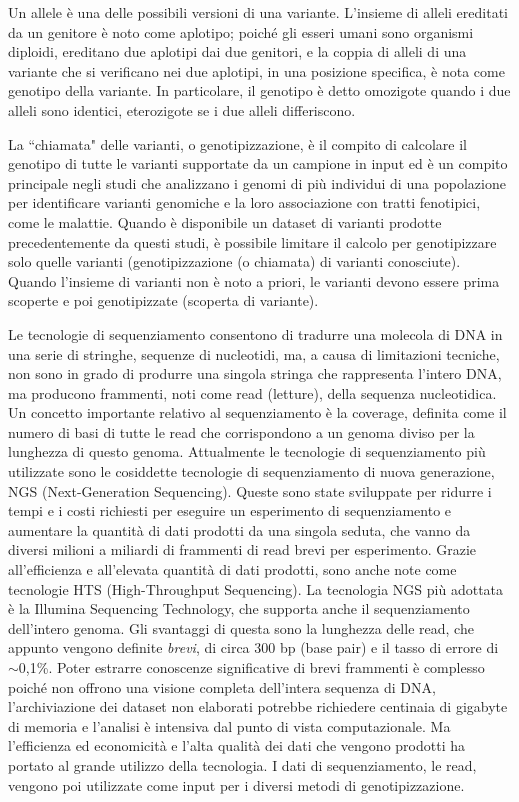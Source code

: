 \documentclass[../main.tex]{subfiles}
\begin{document}
Un allele è una delle possibili versioni di una variante. L'insieme di alleli ereditati da un genitore è noto come aplotipo; poiché gli esseri umani sono organismi diploidi, ereditano due aplotipi dai due genitori, e la coppia di alleli di una variante che si verificano nei due aplotipi, in una posizione specifica, è nota come genotipo della variante. In particolare, il genotipo è detto omozigote quando i due alleli sono identici, eterozigote se i due alleli differiscono. 

La ``chiamata" delle varianti, o genotipizzazione, è il compito di calcolare il genotipo di tutte le varianti supportate da un campione in input ed è un compito principale negli studi che analizzano i genomi di più individui di una popolazione per identificare varianti genomiche e la loro associazione con tratti fenotipici, come le malattie. Quando è disponibile un dataset di varianti prodotte precedentemente da questi studi, è possibile limitare il calcolo per genotipizzare solo quelle varianti (genotipizzazione (o chiamata) di varianti conosciute). Quando l'insieme di varianti non è noto a priori, le varianti devono essere prima scoperte e poi genotipizzate (scoperta di variante).

Le tecnologie di sequenziamento consentono di tradurre una molecola di DNA in una serie di stringhe, sequenze di nucleotidi, ma, a causa di limitazioni tecniche, non sono in grado di produrre una singola stringa che rappresenta l'intero DNA, ma producono frammenti, noti come read (letture), della sequenza nucleotidica. Un concetto importante relativo al sequenziamento è la coverage, definita come il numero di basi di tutte le read che corrispondono a un genoma diviso per la lunghezza di questo genoma. Attualmente le tecnologie di sequenziamento più utilizzate sono le cosiddette tecnologie di sequenziamento di nuova generazione, NGS (Next-Generation Sequencing). Queste sono state sviluppate per ridurre i tempi e i costi richiesti per eseguire un esperimento di sequenziamento e aumentare la quantità di dati prodotti da una singola seduta, che vanno da diversi milioni a miliardi di frammenti di read brevi per esperimento. Grazie all'efficienza e all'elevata quantità di dati prodotti, sono anche note come tecnologie HTS (High-Throughput Sequencing). La tecnologia NGS più adottata è la Illumina Sequencing Technology, che  supporta anche il sequenziamento dell'intero genoma. Gli svantaggi di questa sono la lunghezza delle read, che appunto vengono definite \textit{brevi}, di circa 300 bp (base pair) e il tasso di errore di  $\sim$0,1\%. Poter estrarre conoscenze significative di brevi frammenti è complesso poiché non offrono una visione completa dell'intera sequenza di DNA, l'archiviazione dei dataset non elaborati potrebbe richiedere centinaia di gigabyte di memoria e l'analisi è intensiva dal punto di vista computazionale. Ma l'efficienza ed economicità e l'alta qualità dei dati che vengono prodotti ha portato al grande utilizzo della tecnologia. I dati di sequenziamento, le read, vengono poi utilizzate come input per i diversi metodi di genotipizzazione.
\end{document}
